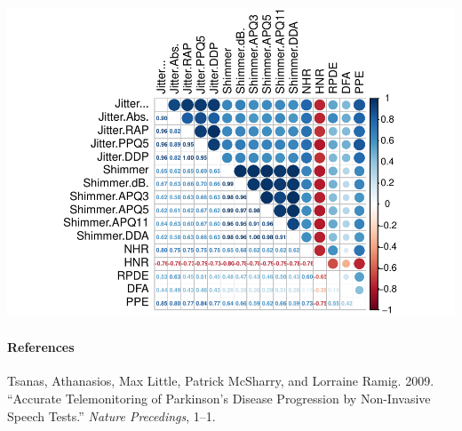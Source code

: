 \documentclass[
]{article}
\newlength{\cslhangindent}
\newlength{\cslentryspacingunit} %
\newenvironment{CSLReferences}[2] %
 {%
  \setlength{\parindent}{0pt}
  \ifodd #1
  \let\oldpar\par
  \def\par{\hangindent=\cslhangindent\oldpar}
  \fi
  \setlength{\parskip}{#2\cslentryspacingunit}
 }%
 {}
\begin{document}
\includegraphics{Data_Exploration_files/figure-latex/unnamed-chunk-17-2.pdf}

\hypertarget{references}{%
\paragraph*{References}\label{references}}

\hypertarget{refs}{}
\begin{CSLReferences}{1}{0}
\leavevmode{}%
Tsanas, Athanasios, Max Little, Patrick McSharry, and Lorraine Ramig.
2009. {``Accurate Telemonitoring of Parkinson's Disease Progression by
Non-Invasive Speech Tests.''} \emph{Nature Precedings}, 1--1.

\end{CSLReferences}
\end{document}
